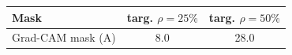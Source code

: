 \begin{tabular}{lcc}
\toprule
Mask & targ. $\rho=25\%$ & targ. $\rho=50\%$ \\
\midrule
Grad-CAM mask (A) & 8.0 & 28.0 \\
\bottomrule
\end{tabular}
